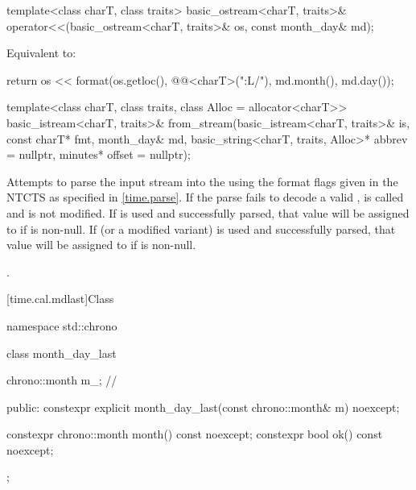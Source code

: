 %
\begin{itemdecl}
template<class charT, class traits>
  basic_ostream<charT, traits>&
    operator<<(basic_ostream<charT, traits>& os, const month_day& md);
\end{itemdecl}

\begin{itemdescr}
\pnum
\effects
Equivalent to:
\begin{codeblock}
return os << format(os.getloc(), @@<charT>("{:L}/{}"),
                    md.month(), md.day());
\end{codeblock}
\end{itemdescr}

%
\begin{itemdecl}
template<class charT, class traits, class Alloc = allocator<charT>>
  basic_istream<charT, traits>&
    from_stream(basic_istream<charT, traits>& is, const charT* fmt,
                month_day& md, basic_string<charT, traits, Alloc>* abbrev = nullptr,
                minutes* offset = nullptr);
\end{itemdecl}

\begin{itemdescr}
\pnum
\effects
Attempts to parse the input stream 
into the   using
the format flags given in the NTCTS 
as specified in \ref{time.parse}.
If the parse fails to decode a valid ,
 is called and
 is not modified.
If  is used and successfully parsed,
that value will be assigned to  if  is non-null.
If  (or a modified variant) is used and successfully parsed,
that value will be assigned to  if  is non-null.

\pnum
\returns
{}.
\end{itemdescr}

[time.cal.mdlast]{Class }

\begin{codeblock}
namespace std::chrono {
  class month_day_last {
    chrono::month m_;                   // \expos

  public:
    constexpr explicit month_day_last(const chrono::month& m) noexcept;

    constexpr chrono::month month() const noexcept;
    constexpr bool ok() const noexcept;
  };
}
\end{codeblock}

